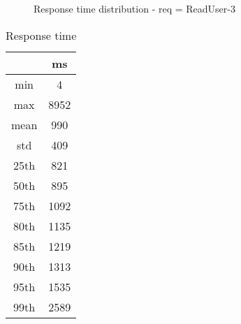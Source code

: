 \begin{minipage}{0.75\linewidth}
\begin{figure}[h]
\begin{adjustbox}{max width=1.0\linewidth, keepaspectratio}
  \end{adjustbox}
  \caption{Response time distribution - req = ReadUser-3}
\end{figure}
\end{minipage}\hfill\begin{minipage}{0.18\linewidth}
\begin{table}[h]
\begin{tabular}{|cc|}
\hline
\textbf{} & \textbf{ms}\\ \hline
 \Xhline{0.005\arrayrulewidth}
min & 4\\
 \Xhline{0.005\arrayrulewidth}
max & 8952\\
 \Xhline{0.005\arrayrulewidth}
mean & 990\\
 \Xhline{0.005\arrayrulewidth}
std & 409\\
\hline
\hline
 \Xhline{0.005\arrayrulewidth}
25th & 821\\
 \Xhline{0.005\arrayrulewidth}
50th & 895\\
 \Xhline{0.005\arrayrulewidth}
75th & 1092\\
 \Xhline{0.005\arrayrulewidth}
80th & 1135\\
 \Xhline{0.005\arrayrulewidth}
85th & 1219\\
 \Xhline{0.005\arrayrulewidth}
90th & 1313\\
 \Xhline{0.005\arrayrulewidth}
95th & 1535\\
 \Xhline{0.005\arrayrulewidth}
99th & 2589\\
\hline
\end{tabular}
\caption{Response time}
\end{table}
\end{minipage}\hfill